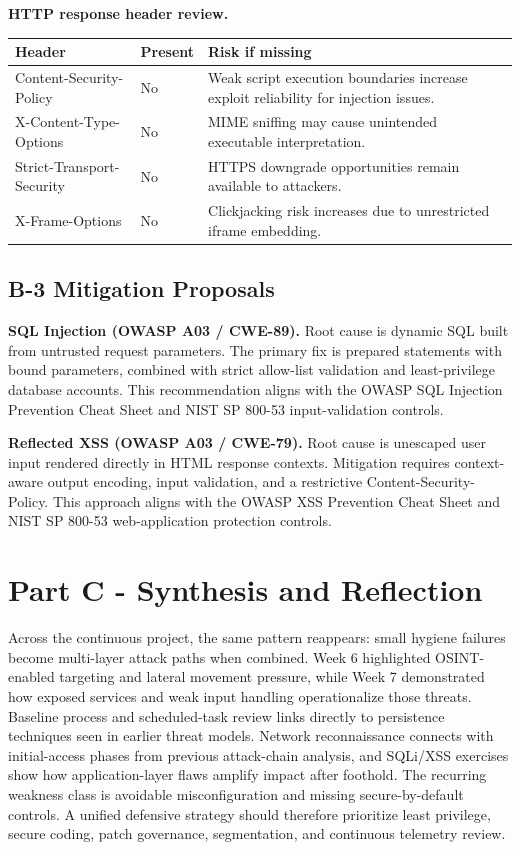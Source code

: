 \documentclass[11pt,a4paper]{article}
\begin{document}
\textbf{HTTP response header review.}
\begin{longtable}{p{4.8cm}p{1.8cm}p{7.6cm}}
\toprule
Header & Present & Risk if missing \\
\midrule
Content-Security-Policy & No & Weak script execution boundaries increase exploit reliability for injection issues. \\
X-Content-Type-Options & No & MIME sniffing may cause unintended executable interpretation. \\
Strict-Transport-Security & No & HTTPS downgrade opportunities remain available to attackers. \\
X-Frame-Options & No & Clickjacking risk increases due to unrestricted iframe embedding. \\
\bottomrule
\end{longtable}

\subsection*{B-3 Mitigation Proposals}
\textbf{SQL Injection (OWASP A03 / CWE-89).} Root cause is dynamic SQL built from untrusted request parameters. The primary fix is prepared statements with bound parameters, combined with strict allow-list validation and least-privilege database accounts. This recommendation aligns with the OWASP SQL Injection Prevention Cheat Sheet and NIST SP 800-53 input-validation controls.

\textbf{Reflected XSS (OWASP A03 / CWE-79).} Root cause is unescaped user input rendered directly in HTML response contexts. Mitigation requires context-aware output encoding, input validation, and a restrictive Content-Security-Policy. This approach aligns with the OWASP XSS Prevention Cheat Sheet and NIST SP 800-53 web-application protection controls.

\section*{Part C - Synthesis and Reflection}
Across the continuous project, the same pattern reappears: small hygiene failures become multi-layer attack paths when combined. Week 6 highlighted OSINT-enabled targeting and lateral movement pressure, while Week 7 demonstrated how exposed services and weak input handling operationalize those threats. Baseline process and scheduled-task review links directly to persistence techniques seen in earlier threat models. Network reconnaissance connects with initial-access phases from previous attack-chain analysis, and SQLi/XSS exercises show how application-layer flaws amplify impact after foothold. The recurring weakness class is avoidable misconfiguration and missing secure-by-default controls. A unified defensive strategy should therefore prioritize least privilege, secure coding, patch governance, segmentation, and continuous telemetry review.
\end{document}

